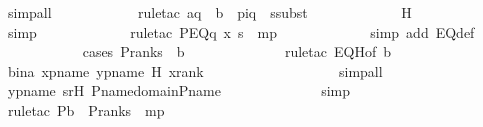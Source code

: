 \begin{isabellebody}
\ simp{\isacharunderscore}{\kern0pt}all\isanewline
\ \ \ \ \ \ \ \ \ \ \isamarkupfalse%
\ {\isacharparenleft}{\kern0pt}rule{\isacharunderscore}{\kern0pt}tac\ a{\isacharequal}{\kern0pt}{\isachardoublequoteopen}{\isasympi}{\isacharbackquote}{\kern0pt}q{\isachardoublequoteclose}\ \ b\ {\isacharequal}{\kern0pt}\ {\isachardoublequoteopen}piq{\isachardoublequoteclose}\ \ ssubst{\isacharparenright}{\kern0pt}\ \isanewline
\ \ \ \ \ \ \ \ \ \ \isamarkupfalse%
\ H\ \isanewline
\ \ \ \ \ \ \ \ \ \ \ \isamarkupfalse%
\ simp\ \isanewline
\ \ \ \ \ \ \ \ \ \ \isamarkupfalse%
\ {\isacharparenleft}{\kern0pt}rule{\isacharunderscore}{\kern0pt}tac\ P{\isacharequal}{\kern0pt}{\isachardoublequoteopen}EQ{\isacharparenleft}{\kern0pt}q{\isacharcomma}{\kern0pt}\ x{\isacharcomma}{\kern0pt}\ s{\isacharparenright}{\kern0pt}{\isachardoublequoteclose}\ \ mp{\isacharparenright}{\kern0pt}\ \isanewline
\ \ \ \ \ \ \ \ \ \ \isamarkupfalse%
\ {\isacharparenleft}{\kern0pt}simp\ add{\isacharcolon}{\kern0pt}\ EQ{\isacharunderscore}{\kern0pt}def{\isacharparenright}{\kern0pt}\ \isanewline
\ \ \ \ \ \ \ \ \ \ \isamarkupfalse%
\ {\isacharparenleft}{\kern0pt}cases\ {\isachardoublequoteopen}P{\isacharunderscore}{\kern0pt}rank{\isacharparenleft}{\kern0pt}s{\isacharparenright}{\kern0pt}\ {\isasymle}\ b{\isachardoublequoteclose}{\isacharparenright}{\kern0pt}\ \isanewline
\ \ \ \ \ \ \ \ \ \ \ \isamarkupfalse%
\ {\isacharparenleft}{\kern0pt}rule{\isacharunderscore}{\kern0pt}tac\ EQH{\isacharbrackleft}{\kern0pt}of\ b{\isacharbrackright}{\kern0pt}{\isacharparenright}{\kern0pt}\ \isamarkupfalse%
\ bina\ xpname\ ypname\ H\ xrank\ \isanewline
\ \ \ \ \ \ \ \ \ \ \ \ \ \ \ \ \isamarkupfalse%
\ simp{\isacharunderscore}{\kern0pt}all\ \isanewline
\ \ \ \ \ \ \ \ \ \ \isamarkupfalse%
\ ypname\ srH\ P{\isacharunderscore}{\kern0pt}name{\isacharunderscore}{\kern0pt}domain{\isacharunderscore}{\kern0pt}P{\isacharunderscore}{\kern0pt}name\ \isanewline
\ \ \ \ \ \ \ \ \ \ \ \isamarkupfalse%
\ simp\ \isanewline
\ \ \ \ \ \ \ \ \ \ \isamarkupfalse%
\ {\isacharparenleft}{\kern0pt}rule{\isacharunderscore}{\kern0pt}tac\ P{\isacharequal}{\kern0pt}{\isachardoublequoteopen}b\ {\isasymle}\ P{\isacharunderscore}{\kern0pt}rank{\isacharparenleft}{\kern0pt}s{\isacharparenright}{\kern0pt}{\isachardoublequoteclose}\ \ mp{\isacharparenright}{\kern0pt}\ \isanewline

\end{isabellebody}

